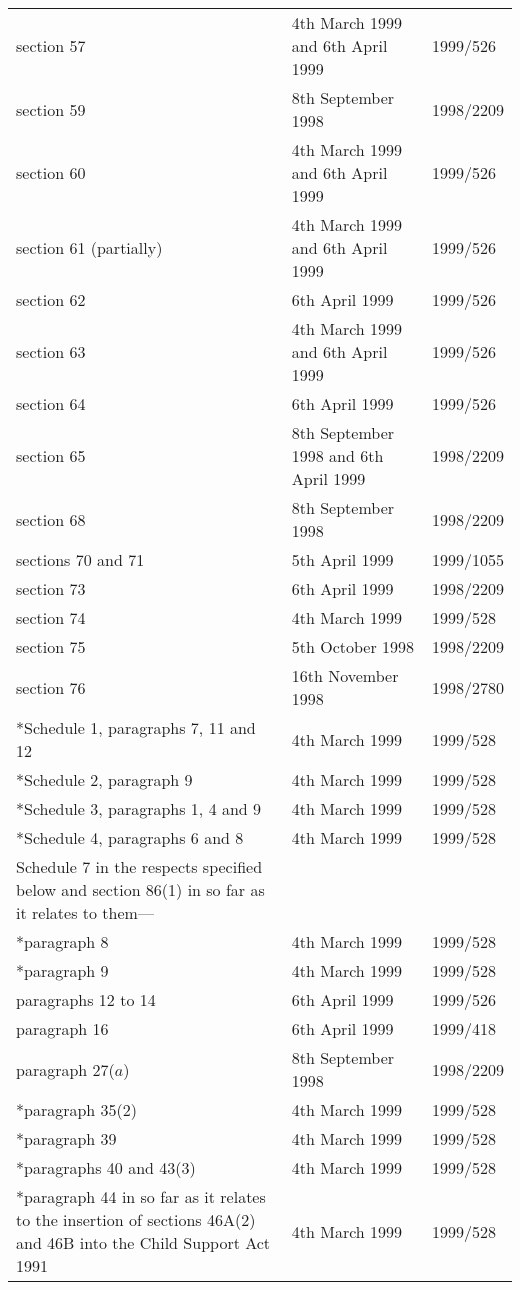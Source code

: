 \documentclass[12pt,a4paper]{article}
\begin{document}
{\begin{longtable}{p{193.78079pt}p{78.37471pt}p{81.83215pt}}
section 57	&4th March 1999 and 6th April 1999	&1999/526\\
section 59	&8th September 1998	&1998/2209\\
section 60	&4th March 1999 and 6th April 1999	&1999/526\\
section 61 (partially)	&4th March 1999 and 6th April 1999	&1999/526\\
section 62	&6th April 1999	&1999/526\\
section 63	&4th March 1999 and 6th April 1999	&1999/526\\
section 64	&6th April 1999	&1999/526\\
section 65	&8th September 1998 and 6th April 1999	&1998/2209\\
section 68	&8th September 1998	&1998/2209\\
sections 70 and 71	&5th April 1999	&1999/1055\\
section 73	&6th April 1999	&1998/2209\\
section 74	&4th March 1999	&1999/528\\
section 75	&5th October 1998	&1998/2209\\
section 76	&16th November 1998	&1998/2780\\
{}*Schedule 1, paragraphs 7, 11 and 12	&4th March 1999	&1999/528\\
{}*Schedule 2, paragraph 9	&4th March 1999	&1999/528\\
{}*Schedule 3, paragraphs 1, 4 and 9&	4th March 1999&	1999/528\\
{}*Schedule 4, paragraphs 6 and 8&	4th March 1999&	1999/528\\
Schedule 7 in the respects specified below and section 86(1) in so far as it relates to them—		\\
{}*paragraph 8	&4th March 1999	&1999/528\\
{}*paragraph 9	&4th March 1999	&1999/528\\
paragraphs 12 to 14	&6th April 1999	&1999/526\\
paragraph 16	&6th April 1999	&1999/418\\
paragraph 27($a$)	&8th September 1998	&1998/2209\\
{}*paragraph 35(2)	&4th March 1999	&1999/528\\
{}*paragraph 39	&4th March 1999	&1999/528\\
{}*paragraphs 40 and 43(3)	&4th March 1999	&1999/528\\
{}*paragraph 44 in so far as it relates to the insertion of sections 46A(2) and 46B into the Child Support Act 1991	&4th March 1999	&1999/528\\

\end{longtable}}
\end{document}

